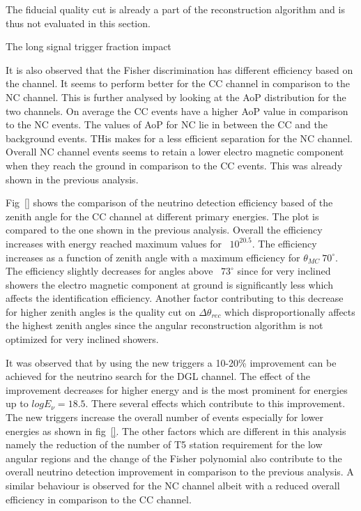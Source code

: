 The fiducial quality cut is already a part of the reconstruction algorithm and is thus not evaluated in this section.

The long signal trigger fraction impact 

It is also observed that the Fisher discrimination has different efficiency based on the channel. It seems to perform better for the CC channel in comparison to the NC channel. This is further analysed by looking at the AoP distribution for the two channels. On average the CC events have a higher AoP value in comparison to the NC events. The values of AoP for NC lie in between the CC and the background events. THis makes for a less efficient separation for the NC channel. Overall NC channel events seems to retain a lower electro magnetic component when they reach the ground in comparison to the CC events. This was already shown in the previous analysis.

Fig~\ref{} shows the comparison of the neutrino detection efficiency based of the zenith angle for the CC channel at different primary energies. The plot is compared to the one shown in the previous analysis. Overall the efficiency increases with energy reached maximum values for ~$10^{20.5}$. The efficiency increases as a function of zenith angle with a maximum efficiency for $\theta_{MC} ~ 70^{\circ}$. The efficiency slightly decreases for angles above ~$73^{\circ}$ since for very inclined showers the electro magnetic component at ground is significantly less which affects the identification efficiency. Another factor contributing to this decrease for higher zenith angles is the quality cut on $\Delta \theta_{rec}$ which disproportionally affects the highest zenith angles since the angular reconstruction algorithm is not optimized for very inclined showers. 

It was observed that by using the new triggers a 10-20\% improvement can be achieved for the neutrino search for the DGL channel. The effect of the improvement decreases for higher energy and is the most prominent for energies up to $log E_{\nu} = 18.5$. There several effects which contribute to this improvement. The new triggers increase the overall number of events especially for lower energies as shown in fig~\ref{}. The other factors which are different in this analysis namely the reduction of the number of T5 station requirement for the low angular regions and the change of the Fisher polynomial also contribute to the overall neutrino detection improvement in comparison to the previous analysis. A similar behaviour is observed for the NC channel albeit with a reduced overall efficiency in comparison to the CC channel. 





